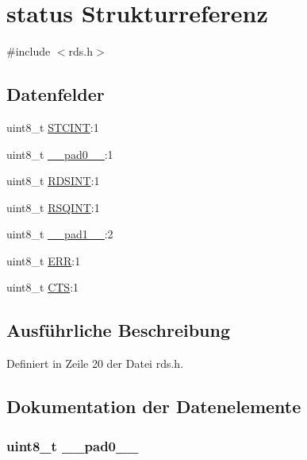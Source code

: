 \hypertarget{structstatus}{}\section{status Strukturreferenz}
\label{structstatus}


{\ttfamily \#include $<$rds.\+h$>$}

\subsection*{Datenfelder}
\begin{DoxyCompactItemize}
\item 
uint8\+\_\+t \hyperlink{structstatus_a1026d3a63b328db2451abc49e0bd5a2c}{S\+T\+C\+I\+N\+T}\+:1
\item 
uint8\+\_\+t \hyperlink{structstatus_a8b4eebe79ded0459acec2f4950102ba3}{\+\_\+\+\_\+pad0\+\_\+\+\_\+}\+:1
\item 
uint8\+\_\+t \hyperlink{structstatus_a4fac7351844086822dbf634529f6cfbd}{R\+D\+S\+I\+N\+T}\+:1
\item 
uint8\+\_\+t \hyperlink{structstatus_a9637ec0bb6d40570ea68a1b96c5d561e}{R\+S\+Q\+I\+N\+T}\+:1
\item 
uint8\+\_\+t \hyperlink{structstatus_a77f12d2e278bd5c07712648ac0df5e08}{\+\_\+\+\_\+pad1\+\_\+\+\_\+}\+:2
\item 
uint8\+\_\+t \hyperlink{structstatus_afb74dff3cfacd68c02883e5282ef2f59}{E\+R\+R}\+:1
\item 
uint8\+\_\+t \hyperlink{structstatus_a7f1760325354f291b9a0190e7e355ca8}{C\+T\+S}\+:1
\end{DoxyCompactItemize}


\subsection{Ausführliche Beschreibung}


Definiert in Zeile 20 der Datei rds.\+h.



\subsection{Dokumentation der Datenelemente}
\hypertarget{structstatus_a8b4eebe79ded0459acec2f4950102ba3}{}
\subsubsection[{\+\_\+\+\_\+pad0\+\_\+\+\_\+}]{\setlength{\rightskip}{0pt plus 5cm}uint8\+\_\+t \+\_\+\+\_\+pad0\+\_\+\+\_\+}\label{structstatus_a8b4eebe79ded0459acec2f4950102ba3}


